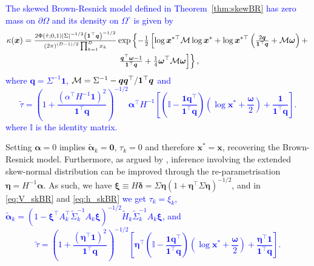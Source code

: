 \documentclass[12pt]{article}
\newcommand{\PZ}{\textcolor{blue}}
\begin{document}
\PZ{\begin{proposition}
\label{prop:AngDesn_skBR}
The skewed Brown-Resnick model defined in Theorem~\ref{thm:skewBR} has zero mass on $\partial\Omega$ and its density on $\Omega^\circ$ is given by
%
\begin{multline}
\label{eq:h_skBR}
\kappa(\bm x) ={\textstyle{2\Phi(\tilde{\tau};0,1)| \Sigma |^{-1/2} \left( \bm 1^\top \bm q\right)^{-1/2}\over\left( 2\pi \right)^{(D-1)/2}\prod_{k=1}^D x_k}}\exp \left\{ -{\textstyle{1\over2}} \left[ \log \bm x^{*\top} {\mathcal M} \log \bm x^* + \log \bm x^{*\top} \left( {\textstyle{2 \bm q\over\bm 1^\top \bm q}} + {\mathcal M}{\bm\omega}\right) + \right.\right. \\ 
\left.\left. {\textstyle{\bm q^\top{\bm \omega} - 1\over\bm 1 ^\top \bm q}} + {\textstyle{1\over4}}\bm\omega^\top{\mathcal M}\bm\omega \right]\right\},
\end{multline}%
where $\bm q = \Sigma^{-1} \bm 1$, ${\mathcal M} = \Sigma^{-1} - \bm q \bm q^\top / \bm 1^\top \bm q$ and  
$$\tilde{\tau}=\left(1 + \frac{\left(\alpha^\top H^{-1}\bm 1\right)^2}{\bm 1^\top \bm q} \right)^{-1/2} \bm\alpha^\top H^{-1}\left[\left(\mathbb{I} - \frac{\bm 1\bm q^\top}{\bm 1^\top \bm q}\right)\left(\log \bm x^* + \frac{{\bm\omega}}{2}\right) +  \frac{\bm 1}{{\bm 1}^\top\bm q}  \right].$$
where $\mathbb{I}$ is the identity matrix. 
\end{proposition}
}

Setting $\bm \alpha = 0$ implies $\tilde{\bm \alpha}_k = \bm 0$, $\tau_k=0$ and therefore $\bm x^* = \bm x$, recovering the Brown-Resnick model. Furthermore, as argued by \citet[][Section~5.2]{Azzalini:2013}, inference involving the extended skew-normal distribution can be improved through the re-parametrisation $\bm \eta = H^{-1} \bm \alpha$. As such, we have $\bm \xi \equiv H \bm \delta = \Sigma \bm \eta \left( 1+\bm \eta^\top \Sigma \bm \eta\right)^{-1/2} $, and in \eqref{eq:V_skBR} and \eqref{eq:h_skBR} 
\PZ{we get $\tau_k = \xi_k$, $\tilde{\bm\alpha}_k = \left(1-\bm\xi^\top A_k^\top\tilde\Sigma_k^{-1} A_k \bm\xi \right)^{-1/2} \tilde H_k\tilde\Sigma_k^{-1}A_k \bm\xi$, and $$\tilde{\tau}=\left(1 + \frac{\left(\bm\eta^\top\bm 1\right)^2}{\bm 1^\top \bm q} \right)^{-1/2} \left[\bm\eta^\top\left(\mathbb I - \frac{\bm 1\bm q^\top}{\bm 1^\top \bm q}\right)\left(\log \bm x^* + \frac{{\bm\omega}}{2}\right) +  \frac{\bm\eta^\top\bm 1}{{\bm 1}^\top\bm q}  \right].$$ 
}
\end{document}
